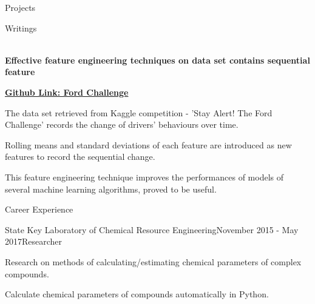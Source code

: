 \documentclass{resume} %
\begin{document}
\begin{rSection}{Projects}





\end{rSection}

\begin{rSection}{Writings}

\\{\bf Effective feature engineering techniques on data set contains sequential feature}

\href{https://github.com/HirahTang/Ford-Challenge}{\bf Github Link: Ford Challenge}

The data set retrieved from Kaggle competition - ’Stay Alert! The Ford Challenge’ records the change of drivers' behaviours over time.

Rolling means and standard deviations of each feature are introduced as new features to record the sequential change.

This feature engineering technique improves the performances of models of several machine learning algorithms, proved to be useful.


\end{rSection}


\begin{rSection}{Career Experience}


\begin{rSubsection}{State Key Laboratory of Chemical Resource Engineering}{November 2015 - May 2017}{Researcher}{}
\item Research on methods of calculating/estimating chemical parameters of complex compounds.
\item Calculate chemical parameters of compounds automatically in Python.
\end{rSubsection}



\end{rSection}
\end{document}
